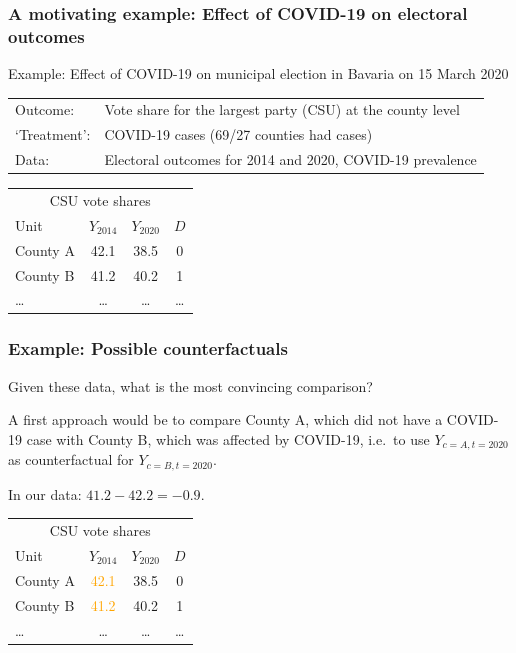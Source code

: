 \documentclass[12pt,english,dvipsnames,aspectratio=169,handout]{beamer}\usepackage[]{graphicx}\usepackage[]{xcolor}
\begin{document}
\begin{frame}
  \frametitle{A motivating example: Effect of COVID-19 on electoral outcomes}
\footnotesize

Example: Effect of COVID-19 on municipal election in Bavaria on 15 March 2020 \cite{leininger_strategic_2020}

\begin{tabular}{ll}
Outcome:     & Vote share for the largest party (CSU) at the county level \\
`Treatment': &  COVID-19 cases (69/27 counties had cases) \\
Data:        & Electoral outcomes for 2014 and 2020, COVID-19 prevalence
\end{tabular}


\scriptsize
\begin{table}\centering
\begin{tabular}{lccc}
\toprule
\multicolumn{4}{c}{CSU vote shares } \\
Unit    & $Y_{2014}$  & $Y_{2020}$  & $D$  \\
\midrule
County A &  42.1     &    38.5   & 0         \\
County B &  41.2     &    40.2   & 1         \\
\ldots  &   \ldots  &  \ldots    & \ldots    \\
\bottomrule
\end{tabular}
\end{table}

\end{frame}



\begin{frame}
  \frametitle{Example: Possible counterfactuals}
\footnotesize

Given these data, what is the most convincing comparison?

A first approach would be to compare County A, which did not have a COVID-19 case with County B, which was affected by COVID-19, i.e.\ to use $Y_{c=A,t=2020}$ as counterfactual for $Y_{c=B,t=2020}$.

In our data: $41.2-42.2=-0.9$.

\scriptsize
\begin{table}\centering
\begin{tabular}{lccc}
\toprule
\multicolumn{4}{c}{CSU vote shares } \\
Unit    & $Y_{2014}$  & $Y_{2020}$  & $D$  \\
\midrule
County A &  \textcolor{orange}{42.1}     &    38.5   & 0         \\
County B &  \textcolor{orange}{41.2}     &    40.2   & 1         \\
\ldots  &   \ldots  &  \ldots   & \ldots   \\
\bottomrule
\end{tabular}
\end{table}
\end{frame}
\end{document}
